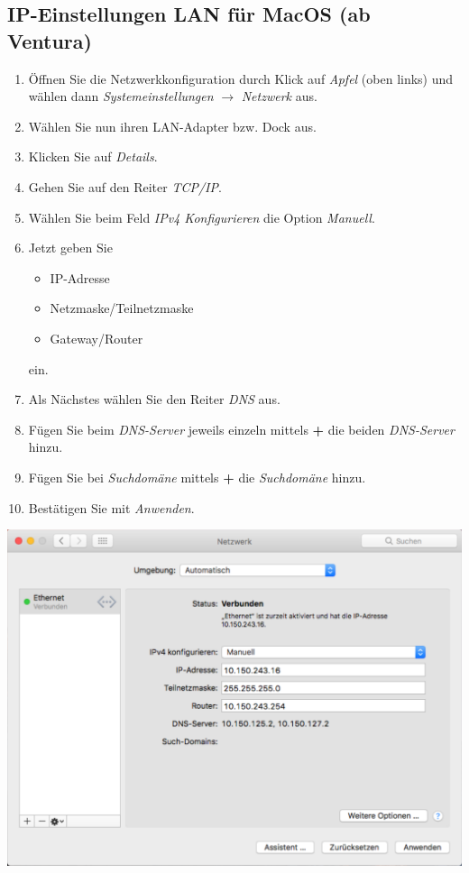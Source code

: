 \documentclass[a4paper,12pt]{scrartcl}
\begin{document}
\subsection{IP-Einstellungen LAN für MacOS (ab Ventura)}

\begin{minipage}{0.57\textwidth}
	\begin{enumerate}
		\item Öffnen Sie die Netzwerkkonfiguration durch Klick auf \emph{Apfel} (oben links) und wählen dann \emph{Systemeinstellungen} $\rightarrow$ \emph{Netzwerk} aus.
		\item Wählen Sie nun ihren LAN-Adapter bzw. Dock aus.
		\item Klicken Sie auf \textit{Details}.
		\item Gehen Sie auf den Reiter \textit{TCP/IP}.
		\item Wählen Sie beim Feld \textit{IPv4 Konfigurieren} die Option \textit{Manuell}.
		\item Jetzt geben Sie
		\begin{itemize}
			\item IP-Adresse
			\item Netzmaske/Teilnetzmaske
			\item Gateway/Router
		\end{itemize}
	ein.
	\item Als Nächstes wählen Sie den Reiter \textit{DNS} aus.
	\item Fügen Sie beim \textit{DNS-Server} jeweils einzeln mittels \textbf{+} die beiden \textit{DNS-Server} hinzu.
	\item Fügen Sie bei \textit{Suchdomäne} mittels \textbf{+} die \textit{Suchdomäne} hinzu.
	\item Bestätigen Sie mit \emph{Anwenden}.
	\end{enumerate}
\end{minipage}
\hfill
\begin{minipage}{0.4\textwidth}
	\centering
	\includegraphics[width=\linewidth,keepaspectratio]{Bilder/IP_MAC}
\end{minipage}
\end{document}
